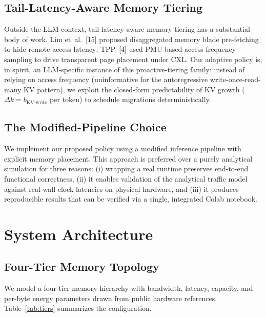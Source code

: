 \documentclass[conference]{IEEEtran}
\begin{document}
\subsection{Tail-Latency-Aware Memory Tiering}

Outside the LLM context, tail-latency-aware memory tiering has a substantial body of work. Lim et~al.~[15] proposed disaggregated memory blade pre-fetching to hide remote-access latency; TPP~[4] used PMU-based access-frequency sampling to drive transparent page placement under CXL. Our adaptive policy is, in spirit, an LLM-specific instance of this proactive-tiering family: instead of relying on access frequency (uninformative for the autoregressive write-once-read-many KV pattern), we exploit the closed-form predictability of KV growth ($\Delta k = b_{\text{KV-write}}$ per token) to schedule migrations deterministically.

\subsection{The Modified-Pipeline Choice}

We implement our proposed policy using a modified inference pipeline with explicit memory placement. This approach is preferred over a purely analytical simulation for three reasons: (i) wrapping a real runtime preserves end-to-end functional correctness, (ii) it enables validation of the analytical traffic model against real wall-clock latencies on physical hardware, and (iii) it produces reproducible results that can be verified via a single, integrated Colab notebook.

\section{System Architecture}
\label{sec:design}

\subsection{Four-Tier Memory Topology}

We model a four-tier memory hierarchy with bandwidth, latency, capacity, and per-byte energy parameters drawn from public hardware references. Table~\ref{tab:tiers} summarizes the configuration.
\end{document}
